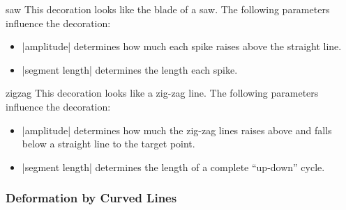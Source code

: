 \begin{decoration}{saw}
  This decoration looks like the blade of a saw. The following parameters
  influence the decoration:
  \begin{itemize}
  \item |amplitude|
    determines how much each spike raises above the straight line.
  \item |segment length|
    determines the length each spike.
  \end{itemize}
\begin{codeexample}[]
\end{codeexample}
\end{decoration}


\begin{decoration}{zigzag}
  This decoration looks like a zig-zag line. The following parameters
  influence the decoration:
  \begin{itemize}
  \item |amplitude|
    determines how much the zig-zag lines raises above and falls below
    a straight line to the target point.
  \item |segment length|
    determines the length of a complete ``up-down'' cycle.
  \end{itemize}
\begin{codeexample}[]
\end{codeexample}
\end{decoration}




\subsubsection{Deformation by Curved Lines}


